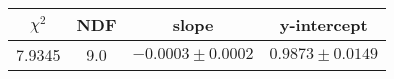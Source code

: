 \begin{tabular}{|c|c|c|c|}

\hline
$\chi^{2}$ & NDF & slope & y-intercept  \\
\hline
7.9345 & 9.0 & $-0.0003\pm0.0002$ & $0.9873\pm0.0149$ \\
\hline

\end{tabular}